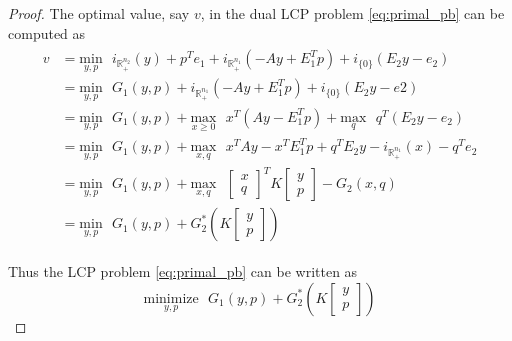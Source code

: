 \documentclass[12pt]{article}
\begin{document}
\begin{proof}
The optimal value, say $v$, in the dual LCP problem \eqref{eq:primal_pb} can be computed as 
\begin{eqnarray*}
  \begin{aligned}
    v &= \underset{y,p}{\text{min}}\text{ }i_{\mathbb{R}^{n_2}_+}(y) + p^Te_1 + i_{\mathbb{R}^{n_1}_+}(-Ay + E_1^Tp) + i_{\{0\}}(E_2y - e_2)\\
    &= \underset{y,p}{\text{min}}\text{ }G_1(y,p) + i_{\mathbb{R}^{n_1}_+}(-Ay + E_1^Tp) + i_{\{0\}}(E_2y - e2)\\
    &= \underset{y,p}{\text{min}}\text{ }G_1(y,p) + \underset{x \geq 0}{\text{max}}\text{ }x^T(Ay - E_1^Tp) + \underset{q}{\text{max}}\text{ }q^T(E_2y - e_2)\\
    &= \underset{y,p}{\text{min}}\text{ }G_1(y,p) + \underset{x, q}{\text{max}}\text{ }x^TAy - x^TE_1^Tp + q^TE_2y - i_{\mathbb{R}^{n_1}_+}(x) - q^Te_2\\
    &= \underset{y,p}{\text{min}}\text{ }G_1(y,p) + \underset{x,q}{\text{max}}\text{ }\begin{bmatrix}x\\q\end{bmatrix}^TK\begin{bmatrix}y\\p\end{bmatrix} - G_2(x, q) \\
      &= \underset{y,p}{\text{min}}\text{ }G_1(y,p) + G_2^*\left(K\begin{bmatrix}y\\p\end{bmatrix}\right)
  \end{aligned}
  \label{eq:a}
\end{eqnarray*}

Thus the LCP problem \eqref{eq:primal_pb} can be written as 
\begin{equation}
  \underset{y,p}{\text{minimize}}\text{ }G_1(y,p) + G_2^*\left(K\begin{bmatrix}y\\p\end{bmatrix}\right)
\end{equation}


\end{proof}
\end{document}
